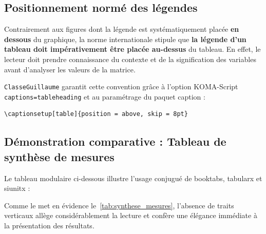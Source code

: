 \subsection{Positionnement normé des légendes}
\label{subsec:position_legendes_tableaux}

Contrairement aux figures dont la légende est systématiquement placée \textbf{en dessous} du graphique, la norme internationale stipule que \textbf{la légende d'un tableau doit impérativement être placée au-dessus} du tableau.
En effet, le lecteur doit prendre connaissance du contexte et de la signification des variables avant d'analyser les valeurs de la matrice.

\texttt{ClasseGuillaume} garantit cette convention grâce à l'option KOMA-Script \texttt{captions=tableheading} et au paramétrage du paquet \textsf{caption} :
\begin{verbatim}
\captionsetup[table]{position = above, skip = 8pt}
\end{verbatim}

\subsection{Démonstration comparative : Tableau de synthèse de mesures}
\label{subsec:demo_synthese_mesures}

Le tableau modulaire ci-dessous illustre l'usage conjugué de \textsf{booktabs}, \textsf{tabularx} et \textsf{siunitx} :



Comme le met en évidence le~\cref{tab:synthese_mesures}, l'absence de traits verticaux allège considérablement la lecture et confère une élégance immédiate à la présentation des résultats.

